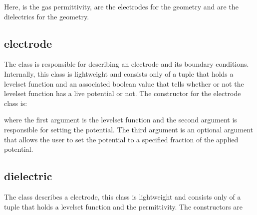 \documentclass[letterpaper,10pt,english]{sphinxmanual}
\begin{document}
Here,  is the gas permittivity,  are the electrodes for the geometry and  are the dielectrics for the geometry.


\subsection{electrode}
\label{\detokenize{ComputationalGeometry:electrode}}\label{\detokenize{ComputationalGeometry:chap-electrode}}
The {\hyperref[\detokenize{ComputationalGeometry:chap-electrode}]{}} class is responsible for describing an electrode and its boundary conditions. Internally, this class is lightweight and consists only of a tuple that holds a level\sphinxhyphen{}set function and an associated boolean value that tells whether or not the level\sphinxhyphen{}set function has a live potential or not. The constructor for the electrode class is:

\begin{sphinxVerbatim}[commandchars=\\\{\},formatcom=\scriptsize]
       
\end{sphinxVerbatim}

where the first argument is the level\sphinxhyphen{}set function and the second argument is responsible for setting the potential. The third argument is an optional argument that allows the user to set the potential to a specified fraction of the applied potential.


\subsection{dielectric}
\label{\detokenize{ComputationalGeometry:dielectric}}\label{\detokenize{ComputationalGeometry:chap-dielectric}}
The {\hyperref[\detokenize{ComputationalGeometry:chap-dielectric}]{}} class describes a electrode, this class is lightweight and consists only of a tuple that holds a level\sphinxhyphen{}set function and the permittivity.
The constructors are

\begin{sphinxVerbatim}[commandchars=\\\{\},formatcom=\scriptsize]
   
     
\end{sphinxVerbatim}
\end{document}

